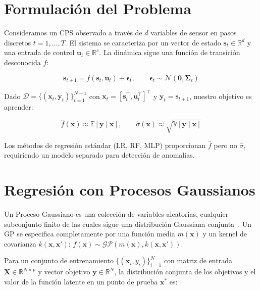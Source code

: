 \documentclass[conference]{IEEEtran}
\begin{document}
\section{Formulación del Problema}
\label{sec:problema}

Consideramos un CPS observado a través de $d$ variables de sensor en pasos discretos $t = 1, \dots, T$. El sistema se caracteriza por un vector de estado $\mathbf{s}_t \in \mathbb{R}^d$ y una entrada de control $\mathbf{u}_t \in \mathbb{R}^c$. La dinámica sigue una función de transición desconocida $f$:

\begin{equation}
\mathbf{s}_{t+1} = f(\mathbf{s}_t, \mathbf{u}_t) + \boldsymbol{\epsilon}_t,\qquad \boldsymbol{\epsilon}_t \sim \mathcal{N}(\mathbf{0}, \boldsymbol{\Sigma}_\epsilon)
\label{eq:transicion}
\end{equation}

Dado $\mathcal{D} = \{(\mathbf{x}_t, \mathbf{y}_t)\}_{t=1}^{N-1}$ con $\mathbf{x}_t = [\mathbf{s}_t^\top, \mathbf{u}_t^\top]^\top$ y $\mathbf{y}_t = \mathbf{s}_{t+1}$, nuestro objetivo es aprender:

\begin{equation}
\hat{f}(\mathbf{x}) \approx \mathbb{E}[\mathbf{y} \mid \mathbf{x}], \qquad \hat{\sigma}(\mathbf{x}) \approx \sqrt{\mathbb{V}[\mathbf{y} \mid \mathbf{x}]}
\label{eq:objetivo}
\end{equation}

Los métodos de regresión estándar (LR, RF, MLP) proporcionan $\hat{f}$ pero no $\hat{\sigma}$, requiriendo un modelo separado para detección de anomalías.

\section{Regresión con Procesos Gaussianos}
\label{sec:prelim}

Un Proceso Gaussiano es una colección de variables aleatorias, cualquier subconjunto finito de las cuales sigue una distribución Gaussiana conjunta~\cite{rasmussen2006}. Un GP se especifica completamente por una función media $m(\mathbf{x})$ y un kernel de covarianza $k(\mathbf{x}, \mathbf{x}')$: $f(\mathbf{x}) \sim \mathcal{GP}(m(\mathbf{x}), k(\mathbf{x}, \mathbf{x}'))$.

Para un conjunto de entrenamiento $\{(\mathbf{x}_i, y_i)\}_{i=1}^N$ con matriz de entrada $\mathbf{X} \in \mathbb{R}^{N \times p}$ y vector objetivo $\mathbf{y} \in \mathbb{R}^N$, la distribución conjunta de los objetivos y el valor de la función latente en un punto de prueba $\mathbf{x}^*$ es:
\end{document}
